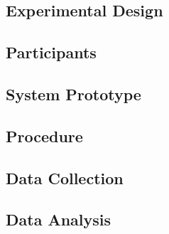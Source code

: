 \subsection{Experimental Design}

\subsection{Participants}

\subsection{System Prototype}

\subsection{Procedure}

\subsection{Data Collection}

\subsection{Data Analysis}